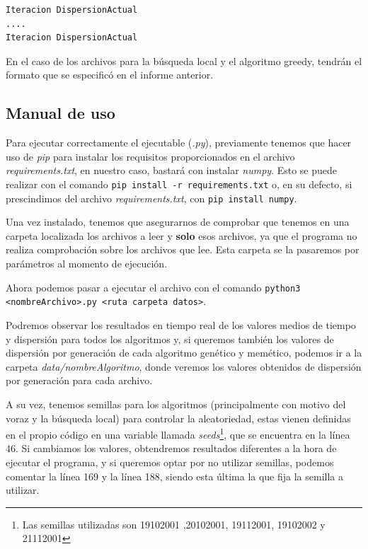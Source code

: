 \begin{lstlisting}[frame=single, caption={Formato de los archivos para guardar la evolución de los algoritmos}, captionpos=b, label=lst:formatoResults]
Iteracion DispersionActual
....
Iteracion DispersionActual
\end{lstlisting}

En el caso de los archivos para la búsqueda local y el algoritmo greedy, tendrán el formato que se especificó en el informe anterior.

\subsection{Manual de uso}

Para ejecutar correctamente el ejecutable (\textit{.py}), previamente tenemos que hacer uso de \textit{pip} para instalar los requisitos proporcionados en el archivo \textit{requirements.txt}, en nuestro caso, bastará con instalar \textit{numpy}.
Esto se puede realizar con el comando \texttt{pip install -r requirements.txt} o, en su defecto, si prescindimos del archivo \textit{requirements.txt}, con \texttt{pip install numpy}.

Una vez instalado, tenemos que asegurarnos de comprobar que tenemos en una carpeta localizada los archivos a leer y \textbf{solo} esos archivos, ya que el programa no realiza comprobación sobre los archivos que lee. Esta carpeta se la pasaremos por parámetros al momento de ejecución.

Ahora podemos pasar a ejecutar el archivo con el comando \texttt{python3 <nombreArchivo>.py <ruta carpeta datos>}.

Podremos observar los resultados en tiempo real de los valores medios de tiempo y dispersión para todos los algoritmos y, si queremos también los valores de dispersión por generación de cada algoritmo genético y memético, podemos ir a la carpeta \textit{data/nombreAlgoritmo}, donde veremos los valores obtenidos de dispersión por generación para cada archivo.

A su vez, tenemos semillas para los algoritmos (principalmente con motivo del voraz y la búsqueda local) para controlar la aleatoriedad, estas vienen definidas en el propio código en una variable llamada \textit{seeds}\footnote{Las semillas utilizadas son 19102001 ,20102001, 19112001, 19102002 y 21112001}, que se encuentra en la línea 46. Si cambiamos los valores, obtendremos resultados diferentes a la hora de ejecutar el programa, y si queremos optar por no utilizar semillas, podemos comentar la línea 169 y la línea 188, siendo esta última la que fija la semilla a utilizar.
\newpage

